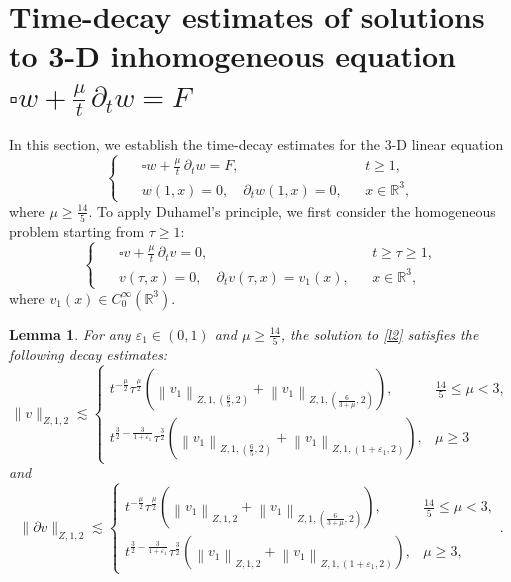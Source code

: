 \documentclass[11pt,twoside]{article}
\newcommand{\R}{\mathbb R}
\newcommand{\p}{\partial}
\newcommand{\f}{\frac}
\theoremstyle{plain}
\newtheorem{lemma}[theorem]{Lemma}
\theoremstyle{definition}
\theoremstyle{remark}
\numberwithin{equation}{section}
\begin{document}
\section{Time-decay estimates of solutions to  3-D inhomogeneous equation $\square w+\f{\mu}{t}\,\p_tw=F$}\label{sec4}
In this section, we establish the time-decay estimates for the 3-D linear equation
\begin{equation}\label{l1}
\left\{ \enspace
\begin{aligned}
&\square w+\f{\mu}{t}\,\p_tw=F, &&
t\geq 1,\\
&w(1,x)=0, \quad \partial_{t} w(1,x)=0, &&x\in\R^3,
\end{aligned}
\right.
\end{equation}
where $\mu\geq\f{14}{5}$. To apply  Duhamel's  principle,  we first consider the homogeneous problem starting from $\tau\ge 1$:
\begin{equation}\label{l2}
\left\{ \enspace
\begin{aligned}
&\square v+\f{\mu}{t}\,\p_tv=0, &&
t\geq \tau \geq1,\\
&v(\tau,x)=0, \quad \partial_{t} v(\tau,x)=v_1( x), &&x\in\R^3,
\end{aligned}
\right.
\end{equation}
where $v_1(x)\in C_0^{\infty}(\R^3)$.
\begin{lemma}\label{lem4}
For any $\varepsilon_1\in(0, 1)$ and $\mu\geq\f{14}{5}$,  the solution to \eqref{l2} satisfies the following decay estimates:
\begin{equation}\label{l3}
\|v\|_{Z, 1, 2} \lesssim \begin{cases}
t^{-\f{\mu}{2}}\tau^{\f{\mu}{2}}(\left\|v_1\right\|_{Z, 1,(\f65, 2)}+\left\|v_1\right\|_{Z, 1,(\f{6}{3+\mu}, 2)}),& \f{14}{5}\leq\mu<3,\\
t^{\f{3}{2}-\f{3}{1+\varepsilon_1}}\tau^\f32(\left\|v_1\right\|_{Z, 1,(\f65, 2)}+\left\|v_1\right\|_{Z, 1,(1+\varepsilon_1, 2)}),& \mu\geq3
\end{cases}
\end{equation}
and
\begin{equation}\label{l4}
\|\p v\|_{Z, 1, 2} \lesssim \begin{cases}
t^{-\f{\mu}{2}}\tau^{\f{\mu}{2}}(\left\|v_1\right\|_{Z, 1,2}+\left\|v_1\right\|_{Z, 1,(\f{6}{3+\mu}, 2)}),& \f{14}{5}\leq\mu<3,\\
t^{\f{3}{2}-\f{3}{1+\varepsilon_1}}\tau^\f32(\left\|v_1\right\|_{Z, 1,2}+\left\|v_1\right\|_{Z, 1,(1+\varepsilon_1, 2)}),& \mu\geq3,
\end{cases}.
\end{equation}
\end{lemma}
\end{document}
